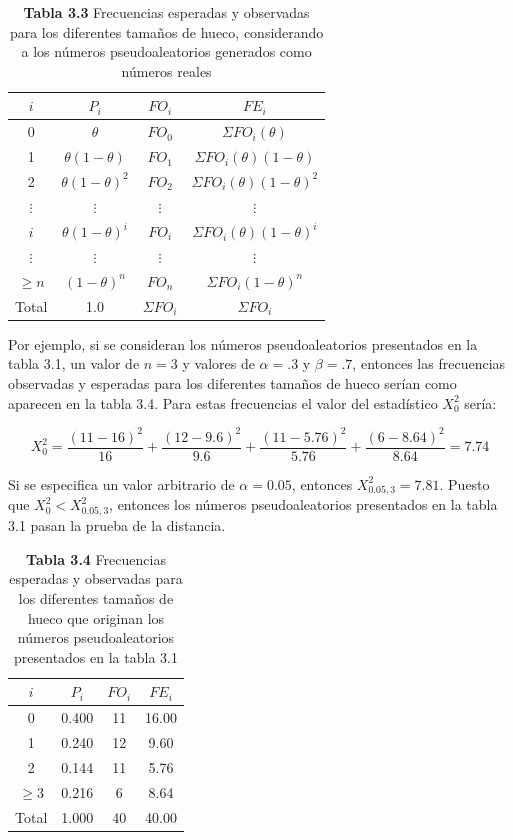 \documentclass[11pt,letterpaper]{report}
\begin{document}
\begin{table}[H]
\centering
\caption*{\textbf{Tabla 3.3} Frecuencias esperadas y observadas para los diferentes tamaños de hueco, considerando a los números pseudoaleatorios generados como números reales}
\begin{tabular}{cccc}
\toprule
$i$ & $P_i$ & $FO_i$ & $FE_i$ \\
\midrule
0 & $\theta$ & $FO_0$ & $\Sigma FO_i (\theta)$ \\
1 & $\theta(1-\theta)$ & $FO_1$ & $\Sigma FO_i (\theta)(1-\theta)$ \\
2 & $\theta(1-\theta)^2$ & $FO_2$ & $\Sigma FO_i (\theta)(1-\theta)^2$ \\
$\vdots$ & $\vdots$ & $\vdots$ & $\vdots$ \\
$i$ & $\theta(1-\theta)^i$ & $FO_i$ & $\Sigma FO_i (\theta)(1-\theta)^i$ \\
$\vdots$ & $\vdots$ & $\vdots$ & $\vdots$ \\
$\ge n$ & $(1-\theta)^n$ & $FO_n$ & $\Sigma FO_i (1-\theta)^n$ \\
\midrule
Total & 1.0 & $\Sigma FO_i$ & $\Sigma FO_i$ \\
\bottomrule
\end{tabular}
\end{table}

Por ejemplo, si se consideran los números pseudoaleatorios presentados
en la tabla 3.1, un valor de $n=3$ y valores de $\alpha=.3$ y
$\beta=.7$, entonces las frecuencias observadas y esperadas para los
diferentes tamaños de hueco serían como aparecen en la tabla 3.4. Para
estas frecuencias el valor del estadístico $X_0^2$ sería:

\begin{equation}
X_0^2 = \frac{(11-16)^2}{16} + \frac{(12-9.6)^2}{9.6} + \frac{(11-5.76)^2}{5.76} + \frac{(6-8.64)^2}{8.64} = 7.74
\end{equation}

Si se especifica un valor arbitrario de $\alpha = 0.05$, entonces
$X^2_{0.05,3} = 7.81$. Puesto que $X_0^2 < X^2_{0.05,3}$, entonces los
números pseudoaleatorios presentados en la tabla 3.1 pasan la prueba de
la distancia.

\begin{table}[H]
\centering
\caption*{\textbf{Tabla 3.4} Frecuencias esperadas y observadas para los diferentes tamaños de hueco que originan los números pseudoaleatorios presentados en la tabla 3.1}
\begin{tabular}{cccc}
\toprule
$i$ & $P_i$ & $FO_i$ & $FE_i$ \\
\midrule
0 & 0.400 & 11 & 16.00 \\
1 & 0.240 & 12 & 9.60 \\
2 & 0.144 & 11 & 5.76 \\
$\ge 3$ & 0.216 & 6 & 8.64 \\
\midrule
Total & 1.000 & 40 & 40.00 \\
\bottomrule
\end{tabular}
\end{table}
\end{document}
